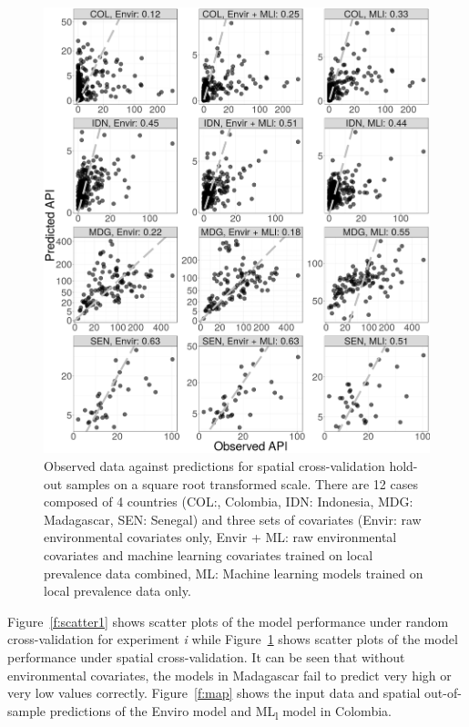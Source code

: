 \documentclass[review]{elsarticle}
\begin{document}
\begin{figure}
  \includegraphics[width=\textwidth]{figs/cv2_l_scatter.png}
\caption{
  Observed data against predictions for spatial cross-validation hold-out samples on a square root transformed scale.
  There are 12 cases composed of 4 countries (COL:, Colombia, IDN: Indonesia, MDG: Madagascar, SEN: Senegal) and three sets of covariates (Envir: raw environmental covariates only, Envir +  ML: raw environmental covariates and machine learning covariates trained on local prevalence data combined, ML: Machine learning models trained on local prevalence data only.
}
\label{f:scatter2}
\end{figure}

Figure~\ref{f:scatter1} shows scatter plots of the model performance under random cross-validation for experiment \emph{i} while Figure~\ref{f:scatter2} shows scatter plots of the model performance under spatial cross-validation.
It can be seen that without environmental covariates, the models in Madagascar fail to predict very high or very low values correctly.
Figure~\ref{f:map} shows the input data and spatial out-of-sample predictions of the Enviro model and ML\textsubscript{l} model in Colombia.
\end{document}
